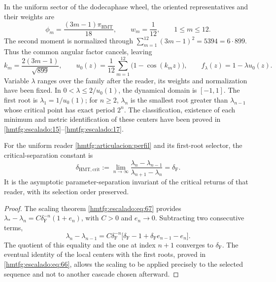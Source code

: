 In the uniform sector of the dodecaphase wheel, the oriented
representatives and their weights are
\[
 \phi_m=\frac{(3m-1)\pi_{\mathrm{HMT}}}{18},\qquad
 w_m=\frac1{12},\qquad 1\le m\le12.
\]
The second moment is normalized through
\(\sum_{m=1}^{12}(3m-1)^2=5394=6\cdot899\).
Thus the common angular factor cancels, leaving
\begin{equation}
 k_m=\frac{2(3m-1)}{\sqrt{899}},\qquad
 u_0(z)=\frac1{12}\sum_{m=1}^{12}\bigl(1-\cos(k_mz)\bigr),
 \qquad f_\lambda(z)=1-\lambda u_0(z).
 \label{hmtfg:articulacion:perfil}
\end{equation}
Variable \(\lambda\) ranges over the family after the
reader, its weights and normalization have been fixed. In
\(0<\lambda\le2/u_0(1)\), the dynamical domain is \([-1,1]\).
The first root is \(\lambda_1=1/u_0(1)\); for \(n\ge2\),
\(\lambda_n\) is the smallest root greater than \(\lambda_{n-1}\)
whose critical point has exact period \(2^n\).
The classification, existence of each minimum and metric
identification of these centers have been proved in
\ref{hmtfg:escalado:15}--\ref{hmtfg:escalado:17}.

\begin{proposition}
\label{hmtfg:articulacion:delta}
For the uniform reader \eqref{hmtfg:articulacion:perfil} and its
first-root selector, the critical-separation constant is
\begin{equation}
 \delta_{\mathrm{HMT,crit}}
 :=\lim_{n\to\infty}
 \frac{\lambda_n-\lambda_{n-1}}{\lambda_{n+1}-\lambda_n}
 =\delta_{\mathrm F}.
 \label{hmtfg:articulacion:limite}
\end{equation}
It is the asymptotic parameter-separation invariant of the critical
returns of that reader, with its selection order preserved.
\end{proposition}
\begin{proof}
The scaling theorem \eqref{hmtfg:escalado:eq:67} provides
\(\lambda_*-\lambda_n=C\delta_{\mathrm F}^{-n}(1+e_n)\),
with \(C>0\) and \(e_n\to0\). Subtracting two consecutive terms,
\[
 \lambda_n-\lambda_{n-1}
 =C\delta_{\mathrm F}^{-n}
   \bigl[\delta_{\mathrm F}-1+
          \delta_{\mathrm F}e_{n-1}-e_n\bigr].
\]
The quotient of this equality and the one at index \(n+1\) converges to
\(\delta_{\mathrm F}\). The eventual identity of the local centers
with the first roots, proved in
\eqref{hmtfg:escalado:eq:66}, allows the scaling to be applied precisely
to the selected sequence and not to another cascade chosen afterward.
\end{proof}

